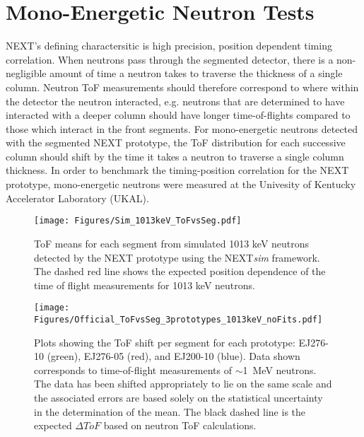 \begin{comment}
\begin{figure*}[ht]
  \centering
  \texttt{[image: Figures/UKsetup.png]}
  \caption{NEXT UKAL setup for measuring mono-energetic neutrons. Show here is the collimator and detector at 95 degrees with respect to initial proton direction, which correlates to detecting 526 keV neutrons. The DAQ is mounted behind the detector encapsulating the power supply, external amplification and digitizers.}
  \label{fig:UKsetup}
\end{figure*}
\end{comment}

\section{Mono-Energetic Neutron Tests}
NEXT's defining charactersitic is high precision, position dependent timing correlation. When neutrons pass through the segmented detector, there is a non-negligible amount of time a neutron takes to traverse the thickness of a single column. Neutron ToF measurements should therefore correspond to where within the detector the neutron interacted, e.g. neutrons that are determined to have interacted with a deeper column should have longer time-of-flights compared to those which interact in the front segments. For mono-energetic neutrons detected with the segmented NEXT prototype, the ToF distribution for each successive column should shift by the time it takes a neutron to traverse a single column thickness. In order to benchmark the timing-position correlation for the NEXT prototype, mono-energetic neutrons were measured at the Univesity of Kentucky Accelerator Laboratory (UKAL).
\begin{figure}[t]
  \texttt{[image: Figures/Sim\_1013keV\_ToFvsSeg.pdf]}
  \caption{ToF means for each segment from simulated 1013 keV neutrons detected by the NEXT prototype using the NEXT\emph{sim} framework. The dashed red line shows the expected position dependence of the time of flight measurements for 1013 keV neutrons.}
  \label{fig:simToFvsSeg}
\end{figure}
\begin{figure}[t]
  \centering
  \texttt{[image: Figures/Official\_ToFvsSeg\_3prototypes\_1013keV\_noFits.pdf]}
  \caption{Plots showing the ToF shift per segment for each prototype: EJ276-10 (green), EJ276-05 (red), and EJ200-10 (blue). Data shown corresponds to time-of-flight measurements of $\sim$1~MeV neutrons. The data has been shifted appropriately to lie on the same scale and the associated errors are based solely on the statistical uncertainty in the determination of the mean. The black dashed line is the expected $\Delta ToF$ based on neutron ToF calculations.}
  \label{fig:ToFvsSeg}
\end{figure}

